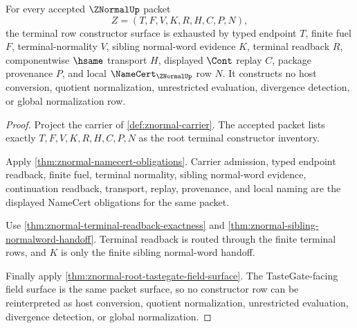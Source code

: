 \begin{theorem}
\label{thm:znormal-terminal-row-constructor-exhaustion}
For every accepted $\ZNormalUp$ packet
$$
Z=(T,F,V,K,R,H,C,P,N),
$$
the terminal row constructor surface is exhausted by typed endpoint $T$,
finite fuel $F$, terminal-normality $V$, sibling normal-word evidence $K$,
terminal readback $R$, componentwise $\hsame$ transport $H$, displayed
$\Cont$ replay $C$, package provenance $P$, and local
$\NameCert_{\ZNormalUp}$ row $N$. It constructs no host conversion, quotient
normalization, unrestricted evaluation, divergence detection, or global
normalization row.
\end{theorem}
\begin{proof}
Project the carrier of \autoref{def:znormal-carrier}. The accepted packet
lists exactly $T,F,V,K,R,H,C,P,N$ as the root terminal constructor inventory.

Apply \autoref{thm:znormal-namecert-obligations}. Carrier admission, typed
endpoint readback, finite fuel, terminal normality, sibling normal-word
evidence, continuation readback, transport, replay, provenance, and local
naming are the displayed NameCert obligations for the same packet.

Use \autoref{thm:znormal-terminal-readback-exactness} and
\autoref{thm:znormal-sibling-normalword-handoff}. Terminal readback is routed
through the finite terminal rows, and $K$ is only the finite sibling
normal-word handoff.

Finally apply \autoref{thm:znormal-root-tastegate-field-surface}. The
TasteGate-facing field surface is the same packet surface, so no constructor
row can be reinterpreted as host conversion, quotient normalization,
unrestricted evaluation, divergence detection, or global normalization.
\end{proof}

